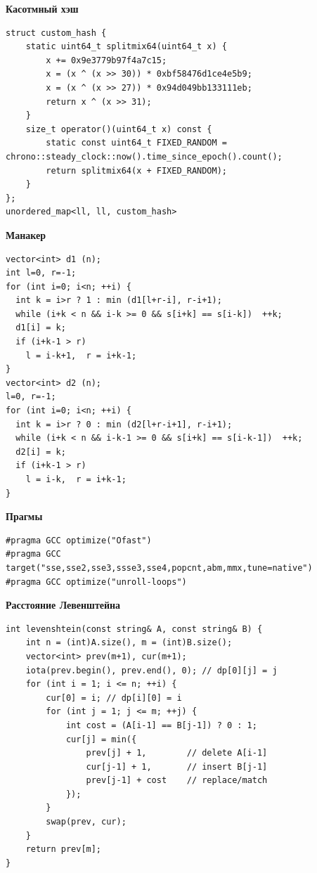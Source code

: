 \documentclass[a4paper, 10pt]{article}
\begin{document}
{\Large \textbf{Касотмный хэш}}
\begin{lstlisting}
struct custom_hash {
    static uint64_t splitmix64(uint64_t x) {
        x += 0x9e3779b97f4a7c15;
        x = (x ^ (x >> 30)) * 0xbf58476d1ce4e5b9;
        x = (x ^ (x >> 27)) * 0x94d049bb133111eb;
        return x ^ (x >> 31);
    }
    size_t operator()(uint64_t x) const {
        static const uint64_t FIXED_RANDOM = chrono::steady_clock::now().time_since_epoch().count();
        return splitmix64(x + FIXED_RANDOM);
    }
};
unordered_map<ll, ll, custom_hash>
\end{lstlisting}

{\Large \textbf{Манакер}}
\begin{lstlisting}
vector<int> d1 (n);
int l=0, r=-1;
for (int i=0; i<n; ++i) {
  int k = i>r ? 1 : min (d1[l+r-i], r-i+1);
  while (i+k < n && i-k >= 0 && s[i+k] == s[i-k])  ++k;
  d1[i] = k;
  if (i+k-1 > r)
    l = i-k+1,  r = i+k-1;
}
vector<int> d2 (n);
l=0, r=-1;
for (int i=0; i<n; ++i) {
  int k = i>r ? 0 : min (d2[l+r-i+1], r-i+1);
  while (i+k < n && i-k-1 >= 0 && s[i+k] == s[i-k-1])  ++k;
  d2[i] = k;
  if (i+k-1 > r)
    l = i-k,  r = i+k-1;
}
\end{lstlisting}

{\Large \textbf{Прагмы}}
\begin{lstlisting}
#pragma GCC optimize("Ofast")
#pragma GCC target("sse,sse2,sse3,ssse3,sse4,popcnt,abm,mmx,tune=native")
#pragma GCC optimize("unroll-loops")
\end{lstlisting}

{\Large \textbf{Расстояние Левенштейна}}
\begin{lstlisting}
int levenshtein(const string& A, const string& B) {
    int n = (int)A.size(), m = (int)B.size();
    vector<int> prev(m+1), cur(m+1);
    iota(prev.begin(), prev.end(), 0); // dp[0][j] = j
    for (int i = 1; i <= n; ++i) {
        cur[0] = i; // dp[i][0] = i
        for (int j = 1; j <= m; ++j) {
            int cost = (A[i-1] == B[j-1]) ? 0 : 1;
            cur[j] = min({
                prev[j] + 1,        // delete A[i-1]
                cur[j-1] + 1,       // insert B[j-1]
                prev[j-1] + cost    // replace/match
            });
        }
        swap(prev, cur);
    }
    return prev[m];
}
\end{lstlisting}
\end{document}
